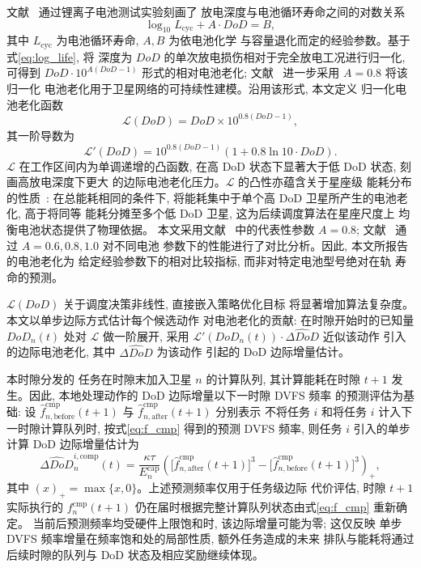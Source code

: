 \documentclass[a4paper,11pt]{article}
\begin{document}
文献~\cite{yang2016energy} 通过锂离子电池测试实验刻画了
放电深度与电池循环寿命之间的对数关系
\begin{equation}
    \log_{10} L_{\mathrm{cyc}} + A \cdot DoD = B,
    \label{eq:log_life}
\end{equation}
其中 $L_{\mathrm{cyc}}$ 为电池循环寿命, $A, B$ 为依电池化学
与容量退化而定的经验参数。基于式\eqref{eq:log_life}, 将
深度为 $DoD$ 的单次放电损伤相对于完全放电工况进行归一化,
可得到 $DoD \cdot 10^{A(DoD-1)}$ 形式的相对电池老化;
文献~\cite{chen2025tasri} 进一步采用 $A = 0.8$ 将该归一化
电池老化用于卫星网络的可持续性建模。沿用该形式, 本文定义
归一化电池老化函数
\begin{equation}
    \mathcal{L}(DoD) = DoD \times 10^{0.8(DoD - 1)},
    \label{eq:health_loss}
\end{equation}
其一阶导数为
\begin{equation}
    \mathcal{L}'(DoD) = 10^{0.8(DoD - 1)}
    \left(1 + 0.8 \ln 10 \cdot DoD\right).
    \label{eq:health_loss_deriv}
\end{equation}
$\mathcal{L}$ 在工作区间内为单调递增的凸函数,
在高 DoD 状态下显著大于低 DoD 状态, 刻画高放电深度下更大
的边际电池老化压力。$\mathcal{L}$ 的凸性亦蕴含关于星座级
能耗分布的性质~\cite{chen2025tasri}: 在总能耗相同的条件下,
将能耗集中于单个高 DoD 卫星所产生的电池老化, 高于将同等
能耗分摊至多个低 DoD 卫星, 这为后续调度算法在星座尺度上
均衡电池状态提供了物理依据。
本文采用文献~\cite{chen2025tasri} 中的代表性参数 $A = 0.8$;
文献~\cite{li2024battery} 通过 $A = 0.6, 0.8, 1.0$ 对不同电池
参数下的性能进行了对比分析。因此, 本文所报告的电池老化为
给定经验参数下的相对比较指标, 而非对特定电池型号绝对在轨
寿命的预测。


$\mathcal{L}(DoD)$ 关于调度决策非线性, 直接嵌入策略优化目标
将显著增加算法复杂度。本文以单步边际方式估计每个候选动作
对电池老化的贡献: 在时隙开始时的已知量 $DoD_n(t)$ 处对
$\mathcal{L}$ 做一阶展开, 采用
$\mathcal{L}'(DoD_n(t)) \cdot \widehat{\Delta DoD}$ 近似该动作
引入的边际电池老化, 其中 $\widehat{\Delta DoD}$ 为该动作
引起的 DoD 边际增量估计。


本时隙分发的
任务在时隙末加入卫星 $n$ 的计算队列, 其计算能耗在时隙 $t+1$
发生。因此, 本地处理动作的 DoD 边际增量以下一时隙 DVFS 频率
的预测评估为基础: 设 $\widehat{f}^{\mathrm{cmp}}_{n,\mathrm{before}}(t+1)$
与 $\widehat{f}^{\mathrm{cmp}}_{n,\mathrm{after}}(t+1)$ 分别表示
不将任务 $i$ 和将任务 $i$ 计入下一时隙计算队列时,
按式\eqref{eq:f_cmp} 得到的预测 DVFS 频率, 则任务 $i$
引入的单步计算 DoD 边际增量估计为
\begin{equation}
    \widehat{\Delta DoD}^{i,\mathrm{comp}}_n(t)
    = \frac{\kappa \tau}{E^{\mathrm{cap}}_n}\left(
    \big[\widehat{f}^{\mathrm{cmp}}_{n,\mathrm{after}}(t+1)\big]^3
    - \big[\widehat{f}^{\mathrm{cmp}}_{n,\mathrm{before}}(t+1)\big]^3
    \right)_+,
    \label{eq:delta_dod_comp_task}
\end{equation}
其中 $(x)_+ = \max\{x, 0\}$。上述预测频率仅用于任务级边际
代价评估, 时隙 $t+1$ 实际执行的 $f^{\mathrm{cmp}}_n(t+1)$
仍在届时根据完整计算队列状态由式\eqref{eq:f_cmp} 重新确定。
当前后预测频率均受硬件上限饱和时, 该边际增量可能为零; 这仅反映
单步 DVFS 频率增量在频率饱和处的局部性质, 额外任务造成的未来
排队与能耗将通过后续时隙的队列与 DoD 状态及相应奖励继续体现。
\end{document}
